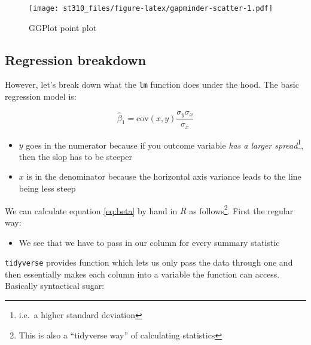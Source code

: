 \documentclass[
]{report}
\newenvironment{Shaded}{\begin{snugshade}}{\end{snugshade}}
\newcommand{\FunctionTok}[1]{\textcolor[rgb]{0.94,0.94,0.56}{#1}}
\newcommand{\NormalTok}[1]{\textcolor[rgb]{0.80,0.80,0.80}{#1}}
\newcommand{\SpecialCharTok}[1]{\textcolor[rgb]{0.86,0.64,0.64}{#1}}
\providecommand{\tightlist}{%
  \setlength{\itemsep}{0pt}\setlength{\parskip}{0pt}}
\renewenvironment{Shaded}{
	\bigskip
	\begin{tcolorbox}[drop fuzzy midday shadow]
		\begin{mdframed}[
				skipabove=\topskip*2,
				outerlinewidth= 0,
				linewidth=0pt,
				roundcorner= 3pt,
				backgroundcolor= shadecolor,
				outerlinecolor= shadecolor,
				innertopmargin= \topskip,
				innerbottommargin=\topskip,
				leftmargin=-0.8cm,
				rightmargin=-0.8cm
			]}{
		\end{mdframed}
	\end{tcolorbox}
	\smallskip
}
\theoremstyle{definition}
\theoremstyle{definition}
\theoremstyle{definition}
\theoremstyle{definition}
\theoremstyle{remark}
\begin{document}
\begin{figure}
\centering
\texttt{[image: st310\_files/figure-latex/gapminder-scatter-1.pdf]}
\caption{\label{fig:gapminder-scatter}GGPlot point plot}
\end{figure}

\hypertarget{regression-breakdown}{%
\subsection{Regression breakdown}\label{regression-breakdown}}

However, let's break down what the \texttt{lm} function does under the hood. The basic
regression model is:

\begin{equation}
  \hat{\beta}_{1} = \text{cov}(x,y)\dfrac{\sigma_{y}\sigma_{x}}{\sigma_x}
  \label{eq:beta}
\end{equation}

\begin{itemize}
\tightlist
\item
  \(y\) goes in the numerator because if you outcome variable \emph{has a larger
  spread}\footnote{i.e.~a higher standard deviation}, then the slop has to be steeper
\item
  \(x\) is in the denominator because the horizontal axis variance leads to the
  line being less steep
\end{itemize}

We can calculate equation \eqref{eq:beta} by hand in \(R\) as follows\footnote{This is
  also a ``tidyverse way'' of calculating statistics}. First the regular way:

\begin{Shaded}
\end{Shaded}

\begin{itemize}
\tightlist
\item
  We see that we have to pass in our column for every summary statistic
\end{itemize}

\texttt{tidyverse} provides function which lets us only pass the data through one and
then essentially makes each column into a variable the function can access.
Basically syntactical sugar:
\end{document}
